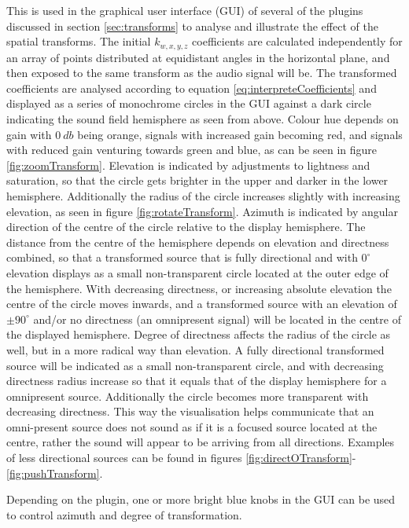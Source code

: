 \documentclass{article}
\begin{document}
This is used in the graphical user interface (GUI) of several of the plugins discussed in section \ref{sec:transforms} to analyse and illustrate the effect of the spatial transforms. 
The initial $k_{w, x, y, z}$ coefficients are calculated independently for an array of points distributed at equidistant angles in the horizontal plane, and then exposed to the same transform as the audio signal will be. 
The transformed coefficients are analysed according to equation \ref{eq:interpreteCoefficients} and displayed as a series of monochrome circles in the GUI against a dark circle indicating the sound field hemisphere as seen from above.
Colour hue depends on gain with $0\: db$ being orange, signals with increased gain becoming red, and signals with reduced gain venturing towards green and blue, as can be seen in figure \ref{fig:zoomTransform}.
Elevation is indicated by adjustments to lightness and saturation, so that the circle gets brighter in the upper and darker in the lower hemisphere.
Additionally the radius of the circle increases slightly with increasing elevation, as seen in figure \ref{fig:rotateTransform}.
Azimuth is indicated by angular direction of the centre of the circle relative to the display hemisphere.
The distance from the centre of the hemisphere depends on elevation and directness combined, so that a transformed source that is fully directional and with $0^{\circ}$ elevation displays as a small non-transparent circle located at the outer edge of the hemisphere.
With decreasing directness, or increasing absolute elevation the centre of the circle moves inwards, and a transformed source with an elevation of $\pm 90^{\circ}$ and/or no directness (an omnipresent signal) will be located in the centre of the displayed hemisphere.
Degree of directness affects the radius of the circle as well, but in a more radical way than elevation. A fully directional transformed source will be indicated as a small non-transparent circle, and with decreasing directness radius increase so that it equals that of the display hemisphere for a omnipresent source.
Additionally the circle becomes more transparent with decreasing directness.
This way the visualisation helps communicate that an omni-present source does not sound as if it is a focused source located at the centre, rather the sound will appear to be arriving from all directions.
Examples of less directional sources can be found in figures \ref{fig:directOTransform}-\ref{fig:pushTransform}.

Depending on the plugin, one or more bright blue knobs in the GUI can be used to control azimuth and degree of transformation.
\end{document}
